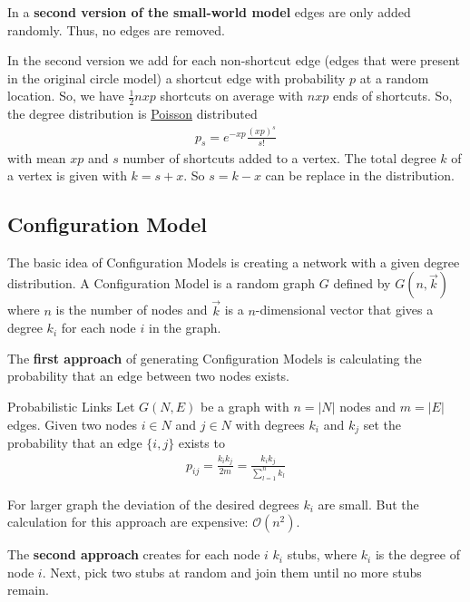 \documentclass[english]{panikzettel}
\begin{document}
In a \textbf{second version of the small-world model} edges are only added randomly. Thus, no edges are removed.

In the second version we add for each non-shortcut edge (edges that were present in the original circle model) a shortcut edge with probability $ p $ at a random location. 
So, we have $ \frac{1}{2} nxp $ shortcuts on average with $ nxp $ ends of shortcuts. So, the degree distribution is \hyperref[sec:poisson_dist]{Poisson} distributed
\begin{align*}
	p_s = e^{-xp}\frac{(xp)^s}{s!}
\end{align*}
with mean $ xp $ and $ s $ number of shortcuts added to a vertex. The total degree $ k $ of a vertex is given with $ k = s + x $. So $ s = k - x $ can be replace in the distribution.

\subsection{Configuration Model}
The basic idea of Configuration Models is creating a network with a given degree distribution. 
A Configuration Model is a random graph $ G $ defined by $ G(n,\vec{k}) $ where $ n $ is the number of nodes and $ \vec{k} $ is a $ n $-dimensional vector that gives a degree $ k_i $ for each node $ i $ in the graph.

The \textbf{first approach} of generating Configuration Models is calculating the probability that an edge between two nodes exists.

\begin{defi}{Probabilistic Links}
	Let $ G(N,E) $ be a graph with $ n = |N| $ nodes and $ m = |E| $ edges.
	Given two nodes $ i \in N $ and $ j \in N $ with degrees $ k_i $ and $ k_j $ set the probability that an edge $ \{i,j\} $ exists to
	\begin{align*}
		p_{ij} = \frac{k_i k_j}{2m} = \frac{k_i k_j}{\sum_{l=1}^{n}k_l}
	\end{align*}
\end{defi}

For larger graph the deviation of the desired degrees $ k_i $ are small. But the calculation for this approach are expensive: $ \mathcal{O}(n^2) $.

The \textbf{second approach} creates for each node $ i $ $ k_i $ stubs, where $ k_i $ is the degree of node $ i $. Next, pick two stubs at random and join them until no more stubs remain.
\end{document}
